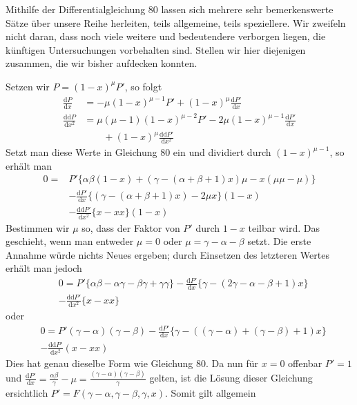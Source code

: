 Mithilfe der Differentialgleichung 80 lassen sich mehrere sehr bemerkenswerte Sätze über unsere Reihe herleiten, teils allgemeine, teils speziellere. Wir zweifeln nicht daran, dass noch viele weitere und bedeutendere verborgen liegen, die künftigen Untersuchungen vorbehalten sind. Stellen wir hier diejenigen zusammen, die wir bisher aufdecken konnten.
\par{}
Setzen wir $P=(1-x)^\mu P'$, so folgt
\[
\begin{aligned}
\frac{\mathrm{d}P}{\mathrm{d}x}&=-\mu(1-x)^{\mu-1}P'+(1-x)^\mu\frac{\mathrm{d}P'}{\mathrm{d}x}\\
\frac{\mathrm{dd}P}{\mathrm{d}x^2}&=\mu(\mu-1)(1-x)^{\mu-2}P'-2\mu(1-x)^{\mu-1}\frac{\mathrm{d}P'}{\mathrm{d}x}\\&\qquad+(1-x)^\mu\frac{\mathrm{dd}P'}{\mathrm{d}x^2}
\end{aligned}
\]
Setzt man diese Werte in Gleichung 80 ein und dividiert durch $(1-x)^{\mu-1}$, so erhält man
\[
\begin{aligned}
0={}&P'\{\alpha\beta(1-x)+(\gamma-(\alpha+\beta+1)x)\mu-x(\mu\mu-\mu)\}\\
&-\frac{\mathrm{d}P'}{\mathrm{d}x}\{(\gamma-(\alpha+\beta+1)x)-2\mu x\}(1-x)\\&-\frac{\mathrm{dd}P'}{\mathrm{d}x^2}\{x-xx\}(1-x)
\end{aligned}
\]
Bestimmen wir $\mu$ so, dass der Faktor von $P'$ durch $1-x$ teilbar wird. Das geschieht, wenn man entweder $\mu=0$ oder $\mu=\gamma-\alpha-\beta$ setzt. Die erste Annahme würde nichts Neues ergeben; durch Einsetzen des letzteren Wertes erhält man jedoch
\[
\begin{aligned}&0=P'\{\alpha\beta-\alpha\gamma-\beta\gamma+\gamma\gamma\}-\frac{\mathrm{d}P'}{\mathrm{d}x}\{\gamma-(2\gamma-\alpha-\beta+1)x\}\\&-\frac{\mathrm{dd}P'}{\mathrm{d}x^2}\{x-xx\}\end{aligned}
\]
oder
\[
\begin{aligned}&0=P'(\gamma-\alpha)(\gamma-\beta)-\frac{\mathrm{d}P'}{\mathrm{d}x}\{\gamma-((\gamma-\alpha)+(\gamma-\beta)+1)x\}\\&-\frac{\mathrm{dd}P'}{\mathrm{d}x^2}(x-xx)\end{aligned}
\]
Dies hat genau dieselbe Form wie Gleichung 80. Da nun für $x=0$ offenbar $P'=1$ und $\frac{\mathrm{d}P'}{\mathrm{d}x}=\frac{\alpha\beta}{\gamma}-\mu=\frac{(\gamma-\alpha)(\gamma-\beta)}{\gamma}$ gelten, ist die Lösung dieser Gleichung ersichtlich $P'=F(\gamma-\alpha,\gamma-\beta,\gamma,x)$. Somit gilt allgemein
